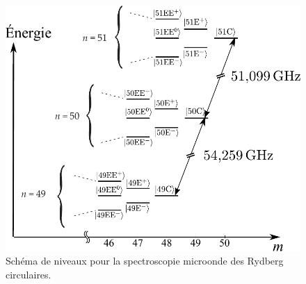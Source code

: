 \begin{figure}[h]
\centering
\includegraphics[width=.7\linewidth]{figures/circulars/levels_49-50-51C}
\caption[Schéma de niveaux pour la spectroscopie microonde des Rydberg circulaires]{
Schéma de niveaux pour la spectroscopie microonde des Rydberg circulaires.
}
\label{fig:levels_49-50-51C}
\end{figure}
		
